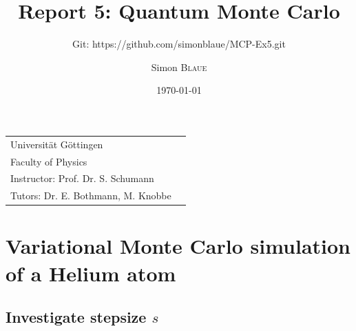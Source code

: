 \documentclass[
	a4paper, %
	10pt, %
]{CSUniSchoolLabReport}
\title{Report 5: Quantum Monte Carlo} %
\subtitle{Git: https://github.com/simonblaue/MCP-Ex5.git}
\author{Simon \textsc{Blaue}} %
\date{\today} %
\begin{document}
\maketitle %

\vspace*{40px}

\begin{tabular}{l r}
	Universität Göttingen \\ %
	Faculty of Physics \\
	Instructor: Prof. Dr. S. Schumann \\
	Tutors: Dr. E. Bothmann, M. Knobbe \\ %
\end{tabular}



\newpage

\ohead{\pagemark}

\section{Variational Monte Carlo simulation of a Helium atom}

\subsection{Investigate stepsize $s$}
\end{document}
